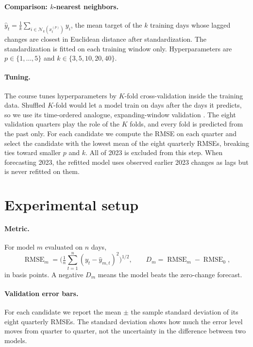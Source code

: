 \documentclass{article}
\newcommand{\RMSE}{\operatorname{RMSE}}
\begin{document}
\paragraph{Comparison: $k$-nearest neighbors.} $\widehat y_t = \frac{1}{k}\sum_{i \in \mathcal N_k(x_t^{(p)})} y_i$, the mean target of the $k$ training days whose lagged changes are closest in Euclidean distance after standardization. The standardization is fitted on each training window only. Hyperparameters are $p \in \{1,\dots,5\}$ and $k \in \{3, 5, 10, 20, 40\}$.

\paragraph{Tuning.} The course tunes hyperparameters by $K$-fold cross-validation inside the training data. Shuffled $K$-fold would let a model train on days after the days it predicts, so we use its time-ordered analogue, expanding-window validation \citep{bergmeir2012}. The eight validation quarters play the role of the $K$ folds, and every fold is predicted from the past only. For each candidate we compute the RMSE on each quarter and select the candidate with the lowest mean of the eight quarterly RMSEs, breaking ties toward smaller $p$ and $k$. All of 2023 is excluded from this step. When forecasting 2023, the refitted model uses observed earlier 2023 changes as lags but is never refitted on them.

\section{Experimental setup}\label{sec:setup}
\paragraph{Metric.} For model $m$ evaluated on $n$ days,
\begin{equation}
  \RMSE_m = \Big(\tfrac{1}{n}\textstyle\sum_{t=1}^{n} (y_t - \widehat y_{m,t})^2\Big)^{1/2}, \qquad D_m = \RMSE_m - \RMSE_0,
  \label{eq:delta}
\end{equation}
in basis points. A negative $D_m$ means the model beats the zero-change forecast.

\paragraph{Validation error bars.} For each candidate we report the mean $\pm$ the sample standard deviation of its eight quarterly RMSEs. The standard deviation shows how much the error level moves from quarter to quarter, not the uncertainty in the difference between two models.
\end{document}
